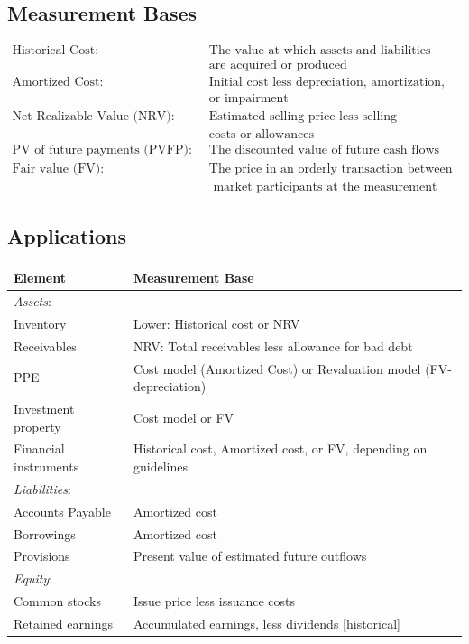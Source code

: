 \documentclass[12pt]{article}
\begin{document}
\subsection{Measurement Bases}
\begin{tcolorbox}
	\begin{align*}
	\text{Historical Cost:}\quad & \text{The value at which assets and liabilities} \\
	\quad & \text{are acquired or produced} \\
	\text{Amortized Cost:} \quad & \text{Initial cost less depreciation, amortization,} \\
	\quad & \text{or impairment} \\
	\text{Net Realizable Value (NRV):} \quad & \text{Estimated selling price less selling } \\
	\quad & \text{costs or allowances} \\
	\text{PV of future payments (PVFP):} \quad & \text{The discounted value of future cash flows} \\
	\text{Fair value (FV):} \quad & \text{The price in an orderly transaction between} \\
	\quad & \text{ market participants at the measurement date}
\end{align*}
\end{tcolorbox}

\subsection{Applications}
\begin{tcolorbox}
\begin{tabularx}{\textwidth}{|l|X|}
	\hline
	\textbf{Element} & \textbf{Measurement Base} \\
	\hline
	\textit{Assets}: & \\
	Inventory & Lower: Historical cost or NRV \\
	Receivables &  NRV: Total receivables less allowance for bad debt\\
	PPE & Cost model (Amortized Cost) or Revaluation model (FV- depreciation) \\
	Investment property & Cost model or FV \\
	Financial instruments & Historical cost, Amortized cost, or FV, depending on guidelines \\
	\hline
	\textit{Liabilities}: & \\
	Accounts Payable & Amortized cost \\	
	Borrowings & Amortized cost \\
	Provisions & Present value of estimated future outflows \\
	\hline
	\textit{Equity}: & \\
	Common stocks & Issue price less issuance costs \\
	Retained earnings & Accumulated earnings, less dividends [historical]\\
	\hline
\end{tabularx}
\end{tcolorbox}	
\end{document}
